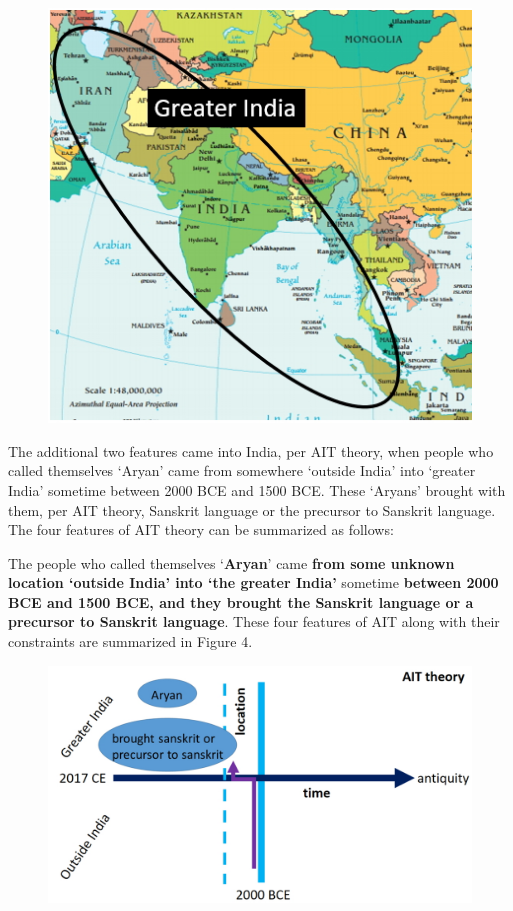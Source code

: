 \begin{figure}[!htbp]
\includegraphics[scale=0.38]{images/8-03.jpg}
\caption{}\label{art8-fig03}
\end{figure}

The additional two features came into India, per AIT theory, when people who called themselves ‘Aryan’ came from somewhere ‘outside India’ into ‘greater India’ sometime between 2000 BCE and 1500 BCE. These ‘Aryans’ brought with them, per AIT theory, Sanskrit language or the precursor to Sanskrit language. The four features of AIT theory can be summarized as follows:

The people who called themselves ‘\textbf{Aryan}’ came \textbf{from some unknown location ‘outside India’ into ‘the greater India’} sometime \textbf{between 2000 BCE and 1500 BCE, and they brought the Sanskrit language or a precursor to Sanskrit language}. These four features of AIT along with their constraints are summarized in Figure 4.

\begin{figure}[!htbp]
\includegraphics[scale=0.21]{images/8-04.jpg}
\caption{}\label{art8-fig04}
\end{figure}


